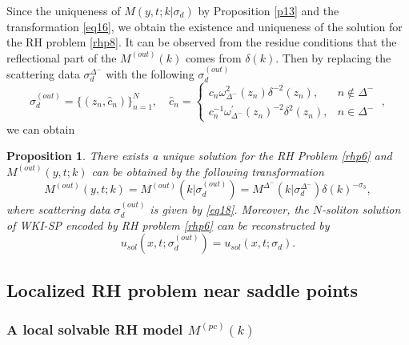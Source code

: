 \documentclass[11pt]{article}
\numberwithin{equation}{section}
\newtheorem{Proposition}{Proposition}
\begin{document}
Since the uniqueness of $M(y, t;k|\sigma_d)$ by Proposition \ref{p13} and the transformation \eqref{eq16}, we obtain the existence and uniqueness of the solution for the RH problem \ref{rhp8}.
It can be observed from the residue conditions that the reflectional part of the $M^{(out)}(k)$ comes from $\delta(k)$. Then by replacing the scattering data $\sigma_d^{\Delta^-}$ with the following $\sigma_d^{(out)}$
\begin{equation}\label{eq18}
    \sigma_d^{(out)} = \{(z_n, \hat c_n)\}_{n=1}^N, \quad \hat c_n = \begin{cases}
     c_n \omega^2_{\Delta^-}(z_n)\delta^{-2}(z_n),&n\notin\Delta^-\\
        c_n^{-1} \omega_{\Delta^-}^{\prime}(z_n)^{-2}\delta^{2}(z_n),&n\in\Delta^-

    \end{cases}\;,
\end{equation}
 we can obtain
\begin{Proposition}\label{p14}
    There exists a unique solution for the RH Problem \ref{rhp6} and $M^{(out)}( y, t;k)$ can be obtained by the following transformation
\begin{equation}
    M^{(out)}( y, t;k) = M^{(out)}(k|\sigma_d^{(out)})=M^{\Delta^-}(k|\sigma_d^{\Delta^-})\delta(k)^{-\sigma_3},
\end{equation}
where scattering data $\sigma_d^{(out)}$ is given by \eqref{eq18}. Moreover, the $N$-soliton solution of WKI-SP encoded by RH problem \ref{rhp6} can be reconstructed by
\begin{equation}
    u_{sol}(x, t;\sigma_d^{(out)})=u_{sol}(x, t;\sigma_d).
\end{equation}
\end{Proposition}







\subsection{Localized RH problem near saddle points}\label{subs3.3}

\subsubsection{\texorpdfstring{A local solvable RH model $M^{(pc)}(k)$}{A local solvable RH model M(pc)(k)}}
\end{document}

